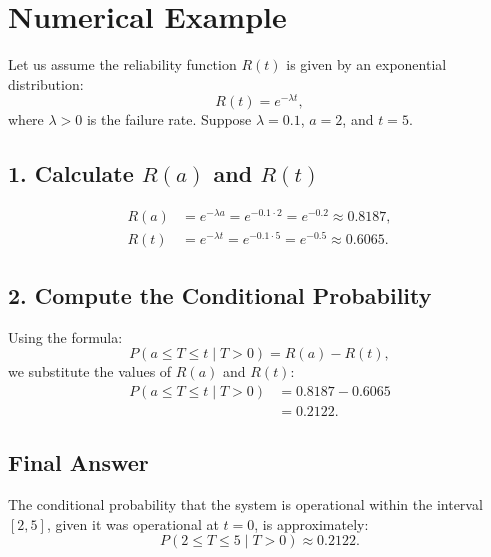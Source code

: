 \documentclass[12pt]{article}
\begin{document}
	\section*{Numerical Example}
	Let us assume the reliability function $R(t)$ is given by an exponential distribution:
	\begin{equation}
		R(t) = e^{-\lambda t},
	\end{equation}
	where $\lambda > 0$ is the failure rate. Suppose $\lambda = 0.1$, $a = 2$, and $t = 5$.
	
	\subsection*{1. Calculate $R(a)$ and $R(t)$}
	\begin{align}
		R(a) &= e^{-\lambda a} = e^{-0.1 \cdot 2} = e^{-0.2} \approx 0.8187, \\
		R(t) &= e^{-\lambda t} = e^{-0.1 \cdot 5} = e^{-0.5} \approx 0.6065.
	\end{align}
	
	\subsection*{2. Compute the Conditional Probability}
	Using the formula:
	\begin{equation}
		P(a \leq T \leq t \mid T > 0) = R(a) - R(t),
	\end{equation}
	we substitute the values of $R(a)$ and $R(t)$:
	\begin{align}
		P(a \leq T \leq t \mid T > 0) &= 0.8187 - 0.6065 \\
		&= 0.2122.
	\end{align}
	
	\subsection*{Final Answer}
	The conditional probability that the system is operational within the interval $[2, 5]$, given it was operational at $t = 0$, is approximately:
	\begin{equation}
		P(2 \leq T \leq 5 \mid T > 0) \approx 0.2122.
	\end{equation}
	
\end{document}
